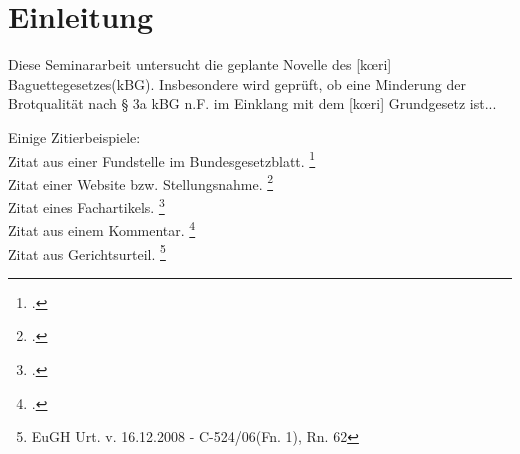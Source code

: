 \section{Einleitung}

Diese Seminararbeit untersucht die geplante Novelle des [kœri] Baguettegesetzes(kBG). Insbesondere wird geprüft, ob eine Minderung der Brotqualität nach \S{} 3a kBG n.F. im Einklang mit dem [kœri] Grundgesetz ist...

Einige Zitierbeispiele: \\
Zitat aus einer Fundstelle im Bundesgesetzblatt. \footcite[S. 130]{bgblI2016} \\ 
Zitat einer Website bzw. Stellungsnahme. \footcite[S. 3]{koerri-beste} \\
Zitat eines Fachartikels. \footcite{tichy} \\
Zitat aus einem Kommentar. \footcite[Tichy/Snelting][Art. 25 Rn. 3]{holger2021} \\
Zitat aus Gerichtsurteil. \footnote{EuGH Urt. v. 16.12.2008 - C-524/06(Fn. 1), Rn. 62}
